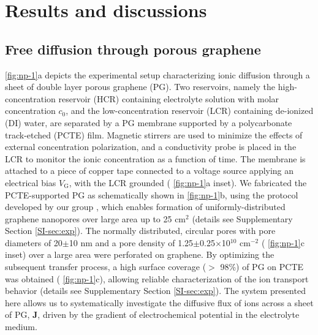\section{Results and discussions}
\label{sec:res}

\subsection{Free diffusion through porous graphene}
\label{sec:res-1}

 \autoref{fig:np-1}a depicts the experimental setup characterizing
ionic diffusion through a sheet of double layer porous graphene
(PG). Two reservoirs, namely the high-concentration reservoir (HCR)
containing electrolyte solution with molar concentration $c_0$, and
the low-concentration reservoir (LCR) containing de-ionized (DI)
water, are separated by a PG membrane supported by a polycarbonate
track-etched (PCTE) film. Magnetic stirrers are used to minimize the
effects of external concentration polarization, and a conductivity
probe is placed in the LCR to monitor the ionic concentration as a
function of time. The membrane is attached to a piece of copper tape
connected to a voltage source applying an electrical bias
$V_{\mathrm{G}}$, with the LCR grounded ( \autoref{fig:np-1}a
inset). We fabricated the PCTE-supported PG as schematically shown in
 \autoref{fig:np-1}b, using the protocol developed by our group
\cite{Choi_2018_wafer_scale_gr}, which enables formation of uniformly-distributed
graphene nanopores over large area up to 25 cm$^{2}$ (details see
Supplementary Section \autoref{SI-sec:exp}). The normally distributed,
circular pores with pore diameters of 20$\pm$10 nm and a pore density
of 1.25$\pm$0.25$\times$10$^{10}$ cm$^{-2}$ ( \autoref{fig:np-1}c
inset) over a large area were perforated on graphene.  By optimizing
the subsequent transfer process, a high surface coverage ($>$ 98\%) of
PG on PCTE was obtained ( \autoref{fig:np-1}c), allowing reliable
characterization of the ion transport behavior (details see
Supplementary Section \autoref{SI-sec:exp}).  The system presented here
allows us to systematically investigate the diffusive flux of ions
across a sheet of PG, $\boldsymbol{J}$, driven by the gradient of
electrochemical potential in the electrolyte medium.

